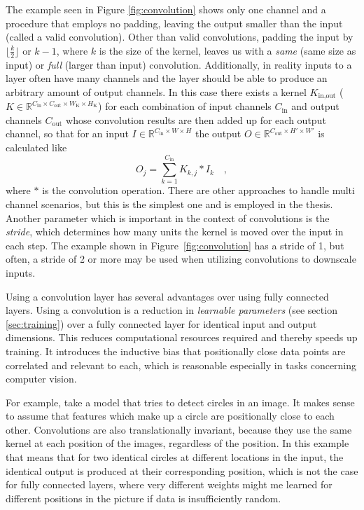 The example seen in Figure \ref{fig:convolution} shows only one channel and a procedure that employs no padding, leaving the output smaller than the input (called a valid convolution). Other than valid convolutions, padding the input by $\lfloor\frac{k}{2}\rfloor$ or $k - 1$, where $k$ is the size of the kernel, leaves us with a \emph{same} (same size as input) or \emph{full} (larger than input) convolution. Additionally, in reality inputs to a layer often have many channels and the layer should be able to produce an arbitrary amount of output channels. In this case there exists a kernel $K_{\text{in}, \text{out}}$ ($K\in \mathbb{R}^{C_\text{in}\times C_\text{out}\times W_\text{K} \times H_\text{K}}$) for each combination of input channels $C_\text{in}$ and output channels $C_{\text{out}}$ whose convolution results are then added up for each output channel, so that for an input $I\in \mathbb{R}^{C_\text{in}\times W \times H}$ the output $O\in \mathbb{R}^{C_\text{out}\times H' \times W'}$ is calculated like
$$
    O_j = \sum_{k=1}^{C_\text{in}} K_{k,j} * I_k\quad,
$$
where $*$ is the convolution operation. There are other approaches to handle multi channel scenarios, but this is the simplest one and is employed in the thesis.
Another parameter which is important in the context of convolutions is the \emph{stride}, which determines how many units the kernel is moved over the input in each step. The example shown in Figure~\ref{fig:convolution} has a stride of 1, but often, a stride of 2 or more may be used when utilizing convolutions to downscale inputs.

Using a convolution layer has several advantages over using fully connected layers. Using a convolution is a reduction in \emph{learnable parameters} (see section \ref{sec:training}) over a fully connected layer for identical input and output dimensions. This reduces computational resources required and thereby speeds up training. It introduces the inductive bias that positionally close data points are correlated and relevant to each, which is reasonable especially in tasks concerning computer vision. 

For example, take a model that tries to detect circles in an image. It makes sense to assume that features which make up a circle are positionally close to each other. Convolutions are also translationally invariant, because they use the same kernel at each position of the images, regardless of the position. 
In this example that means that for two identical circles at different locations in the input, the identical output is produced at their corresponding position, which is not the case for fully connected layers, where very different weights might me learned for different positions in the picture if data is insufficiently random.

